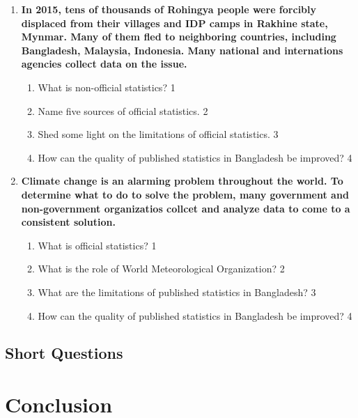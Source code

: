 \documentclass[a4paper,oneside]{book}
\begin{document}
  \begin{enumerate}
 \item
	  \textbf{In 2015, tens of thousands of Rohingya people were forcibly displaced from their villages and IDP camps in Rakhine state, Mynmar. Many of them fled to neighboring countries, including Bangladesh, Malaysia, Indonesia. Many national and internations agencies collect data on the issue.} 
  
  \begin{enumerate}
    \item
	What is non-official statistics? \hfill 1
    \item
	Name five sources of official statistics. \hfill 2
    \item  
	Shed some light on the limitations of official statistics. \hfill 3
    \item
	How can the quality of published statistics in Bangladesh be improved? \hfill 4
  \end{enumerate}
  
   \item
	  \textbf{Climate change is an alarming problem throughout the world. To determine what to do to solve the problem, many government and non-government organizatios collcet and analyze data  to come to a consistent solution.} 
  
  \begin{enumerate}
    \item
	What is official statistics?  \hfill 1
    \item
	What is the role of World Meteorological Organization? \hfill 2
    \item  
	What are the limitations of published statistics in Bangladesh? \hfill 3
    \item
	How can the quality of published statistics in Bangladesh be improved? \hfill 4
  \end{enumerate}
 \end{enumerate}
\section{Short Questions}

\backmatter
\chapter{Conclusion}
\lipsum[8]

\tableofcontents
\end{document}
